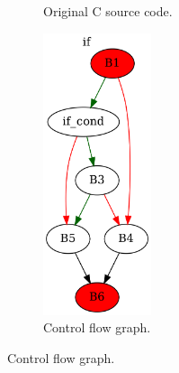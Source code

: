 \begin{figure}[htbp]
	\centering
	\begin{subfigure}[b]{0.30\textwidth}
		\centering
		
		\caption{Original C source code.}
	\end{subfigure}
	\begin{subfigure}[b]{0.50\textwidth}
		\centering
		\includegraphics[width=0.35\textwidth]{inc/appendices/examples/interval/counter-example/bool_propagation_jump/f_0002a.png}
		\caption{Control flow graph.}
	\end{subfigure}
\end{figure}

